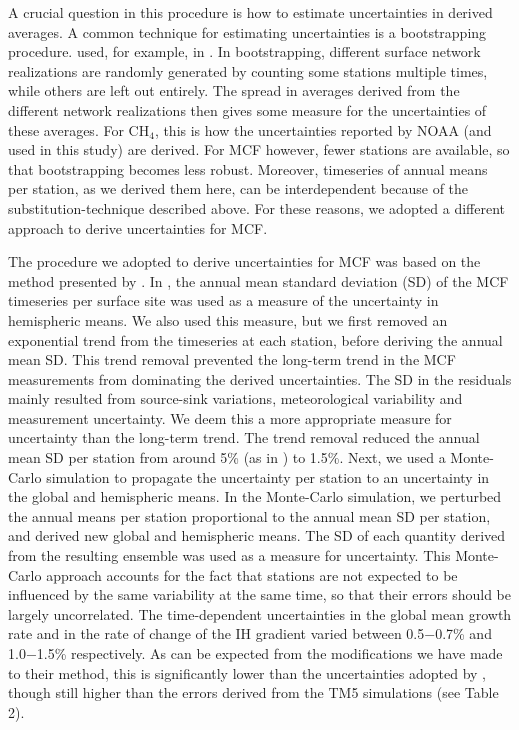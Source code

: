 \documentclass[10pt]{article}
\begin{document}
A crucial question in this procedure is how to estimate uncertainties in derived averages. A common technique for estimating uncertainties is a bootstrapping procedure. used, for example, in \cite{turner2017}. In bootstrapping, different surface network realizations are randomly generated by counting some stations multiple times, while others are left out entirely. The spread in averages derived from the different network realizations then gives some measure for the uncertainties of these averages. For CH$_4$, this is how the uncertainties reported by NOAA (and used in this study) are derived. For MCF however, fewer stations are available, so that bootstrapping becomes less robust. Moreover, timeseries of annual means per station, as we derived them here, can be interdependent because of the substitution-technique described above. For these reasons, we adopted a different approach to derive uncertainties for MCF.

The procedure we adopted to derive uncertainties for MCF was based on the method presented by \cite{rigby2017}. In \cite{rigby2017}, the annual mean standard deviation (SD) of the MCF timeseries per surface site was used as a measure of the uncertainty in hemispheric means. We also used this measure, but we first removed an exponential trend from the timeseries at each station, before deriving the annual mean SD. This trend removal prevented the long-term trend in the MCF measurements from dominating the derived uncertainties. The SD in the residuals mainly resulted from source-sink variations, meteorological variability and measurement uncertainty. We deem this a more appropriate measure for uncertainty than the long-term trend. The trend removal reduced the annual mean SD per station from around 5\% (as in \cite{rigby2017}) to 1.5\%. 
Next, we used a Monte-Carlo simulation to propagate the uncertainty per station to an uncertainty in the global and hemispheric means. In the Monte-Carlo simulation, we perturbed the annual means per station proportional to the annual mean SD per station, and derived new global and hemispheric means. The SD of each quantity derived from the resulting ensemble was used as a measure for uncertainty. This Monte-Carlo approach accounts for the fact that stations are not expected to be influenced by the same variability at the same time, so that their errors should be largely uncorrelated. The time-dependent uncertainties in the global mean growth rate and in the rate of change of the IH gradient varied between 0.5$-$0.7\% and 1.0$-$1.5\% respectively. As can be expected from the modifications we have made to their method, this is significantly lower than the uncertainties adopted by \cite{rigby2017}, though still higher than the errors derived from the TM5 simulations (see Table 2). 
\end{document}
